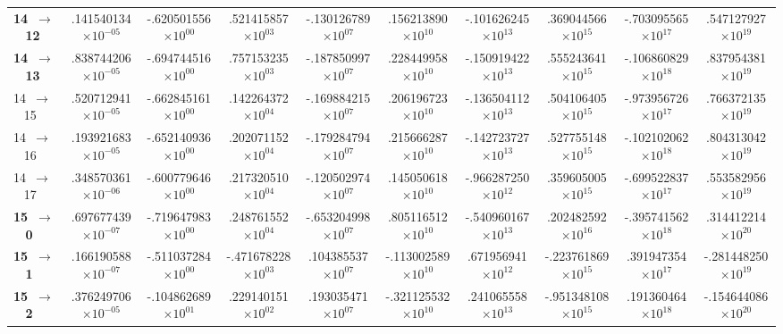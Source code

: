 \documentclass[reviewcopy]{elsarticle}
\begin{document}
\begin{landscape}
\begin{longtable}{lccccccccc}
{\bf 14~$\to$~ 12}  &   .141540134$\times10^{-05}$ & -.620501556$\times10^{ 00}$ &  .521415857$\times10^{ 03}$ & -.130126789$\times10^{ 07}$ &  .156213890$\times10^{ 10}$ & -.101626245$\times10^{ 13}$ &  .369044566$\times10^{ 15}$ & -.703095565$\times10^{ 17}$ &  .547127927$\times10^{ 19}$ \\
{\bf 14~$\to$~ 13}  &   .838744206$\times10^{-05}$ & -.694744516$\times10^{ 00}$ &  .757153235$\times10^{ 03}$ & -.187850997$\times10^{ 07}$ &  .228449958$\times10^{ 10}$ & -.150919422$\times10^{ 13}$ &  .555243641$\times10^{ 15}$ & -.106860829$\times10^{ 18}$ &  .837954381$\times10^{ 19}$ \\
 14~$\to$~ 15  &   .520712941$\times10^{-05}$ & -.662845161$\times10^{ 00}$ &  .142264372$\times10^{ 04}$ & -.169884215$\times10^{ 07}$ &  .206196723$\times10^{ 10}$ & -.136504112$\times10^{ 13}$ &  .504106405$\times10^{ 15}$ & -.973956726$\times10^{ 17}$ &  .766372135$\times10^{ 19}$ \\
 14~$\to$~ 16  &   .193921683$\times10^{-05}$ & -.652140936$\times10^{ 00}$ &  .202071152$\times10^{ 04}$ & -.179284794$\times10^{ 07}$ &  .215666287$\times10^{ 10}$ & -.142723727$\times10^{ 13}$ &  .527755148$\times10^{ 15}$ & -.102102062$\times10^{ 18}$ &  .804313042$\times10^{ 19}$ \\
 14~$\to$~ 17  &   .348570361$\times10^{-06}$ & -.600779646$\times10^{ 00}$ &  .217320510$\times10^{ 04}$ & -.120502974$\times10^{ 07}$ &  .145050618$\times10^{ 10}$ & -.966287250$\times10^{ 12}$ &  .359605005$\times10^{ 15}$ & -.699522837$\times10^{ 17}$ &  .553582956$\times10^{ 19}$ \\[7pt]
{\bf 15~$\to$~ 0}   &   .697677439$\times10^{-07}$ & -.719647983$\times10^{ 00}$ &  .248761552$\times10^{ 04}$ & -.653204998$\times10^{ 07}$ &  .805116512$\times10^{ 10}$ & -.540960167$\times10^{ 13}$ &  .202482592$\times10^{ 16}$ & -.395741562$\times10^{ 18}$ &  .314412214$\times10^{ 20}$ \\
{\bf 15~$\to$~ 1}   &   .166190588$\times10^{-07}$ & -.511037284$\times10^{ 00}$ & -.471678228$\times10^{ 03}$ &  .104385537$\times10^{ 07}$ & -.113002589$\times10^{ 10}$ &  .671956941$\times10^{ 12}$ & -.223761869$\times10^{ 15}$ &  .391947354$\times10^{ 17}$ & -.281448250$\times10^{ 19}$ \\
{\bf 15~$\to$~ 2}   &   .376249706$\times10^{-05}$ & -.104862689$\times10^{ 01}$ &  .229140151$\times10^{ 02}$ &  .193035471$\times10^{ 07}$ & -.321125532$\times10^{ 10}$ &  .241065558$\times10^{ 13}$ & -.951348108$\times10^{ 15}$ &  .191360464$\times10^{ 18}$ & -.154644086$\times10^{ 20}$ \\

\end{longtable}
\end{landscape}
\end{document}
